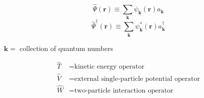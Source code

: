 \documentclass[compress]{beamer}
\begin{document}
\frame
{
  \frametitle{}
\begin{small}
{\scriptsize
  \begin{equation}
    \hat{\Psi}(\mathbf{r})\equiv \sum_{\mathbf{k}}\psi_{\mathbf{k}}(\mathbf{r})a_{\mathbf{k}} \nonumber
  \end{equation}
  \begin{equation}
    \hat{\Psi}^{\dagger }(\mathbf{r})\equiv \sum_{\mathbf{k}}\psi_{\mathbf{k}}^{*}(\mathbf{r})a_{\mathbf{k}}^{\dagger } \nonumber
  \end{equation}
\begin{center}
$\mathbf{k} = $ collection of quantum numbers
\end{center}

\begin{align}
  \hat{T} &= \text{kinetic energy operator} \nonumber \\
  \hat{V} &= \text{external single-particle potential operator} \nonumber \\
  \hat{W} &= \text{two-particle interaction operator} \nonumber
\end{align}
}
\end{small}
}
\end{document}
